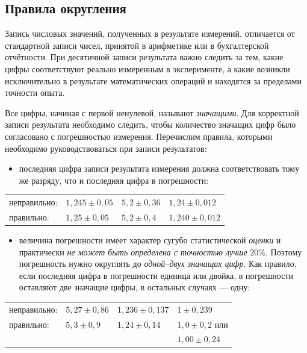 \subsection{Правила округления}\label{subsec:round}

Запись числовых значений, полученных в результате измерений, отличается
от стандартной записи чисел, принятой в арифметике или в бухгалтерской
отчётности. При десятичной записи результата важно следить за тем,
какие цифры соответствуют реально измеренным в эксперименте, а какие
возникли исключительно в результате математических операций и находятся
за пределами точности опыта.

Все цифры, начиная с первой ненулевой, называют \emph{значащими}.
Для корректной записи результата необходимо следить, чтобы количество
значащих цифр было согласовано с погрешностью измерения. Перечислим
правила, которыми необходимо руководствоваться при записи результатов:
\small
\begin{itemize}
\item последняя цифра записи результата измерения должна соответствовать
тому же разряду, что и последняя цифра в погрешности:
\end{itemize}
\noindent%
\begin{tabular}{llll}
    \color{red}неправильно:  &
    \color{red}$1{,}245\pm0{,}05$  &
    \color{red}$5{,}2\pm0{,}36$  &
    \color{red}$1{,}24\pm0{,}012$\\
правильно:  & $1{,}25\pm0{,}05$  & $5{,}2\pm0{,}4$  & $1{,}240\pm0{,}012$
\end{tabular}
\begin{itemize}
\item величина погрешности имеет характер сугубо статистической \emph{оценки}
и практически \emph{не может быть определена с точностью лучше} 20\%.
Поэтому погрешность нужно округлять до \emph{одной--двух
значащих цифр}. Как правило, если последняя цифра в погрешности единица
или двойка, в погрешности оставляют две значащие цифры, в остальных
случаях --- одну:
\end{itemize}
\noindent%
\begin{tabular}{llll}
\color{red}неправильно:  &
\color{red}$5{,}27\pm0{,}86$  &
\color{red}$1{,}236\pm0{,}137$  &
\color{red}$1\pm0{,}239$\\
правильно:  & $5{,}3\pm0{,}9$ & $1{,}24\pm0{,}14$ & $1{,}0\pm0{,}2$ или\\
 &  &  & $1{,}00\pm0{,}24$
\end{tabular}\par
\medskip
